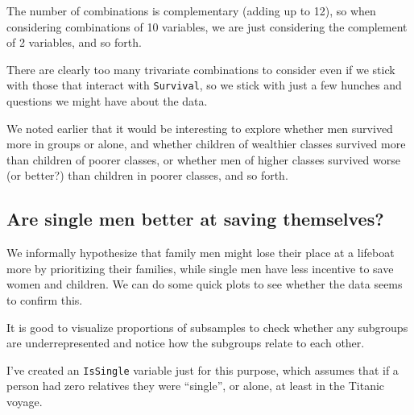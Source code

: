 \documentclass[]{article}
\newenvironment{Shaded}{\begin{snugshade}}{\end{snugshade}}
\newcommand{\KeywordTok}[1]{\textcolor[rgb]{0.13,0.29,0.53}{\textbf{#1}}}
\newcommand{\DataTypeTok}[1]{\textcolor[rgb]{0.13,0.29,0.53}{#1}}
\newcommand{\DecValTok}[1]{\textcolor[rgb]{0.00,0.00,0.81}{#1}}
\newcommand{\StringTok}[1]{\textcolor[rgb]{0.31,0.60,0.02}{#1}}
\newcommand{\CommentTok}[1]{\textcolor[rgb]{0.56,0.35,0.01}{\textit{#1}}}
\newcommand{\OperatorTok}[1]{\textcolor[rgb]{0.81,0.36,0.00}{\textbf{#1}}}
\newcommand{\NormalTok}[1]{#1}
\begin{document}
The number of combinations is complementary (adding up to 12), so when
considering combinations of 10 variables, we are just considering the
complement of 2 variables, and so forth.

There are clearly too many trivariate combinations to consider even if
we stick with those that interact with \texttt{Survival}, so we stick
with just a few hunches and questions we might have about the data.

We noted earlier that it would be interesting to explore whether men
survived more in groups or alone, and whether children of wealthier
classes survived more than children of poorer classes, or whether men of
higher classes survived worse (or better?) than children in poorer
classes, and so forth.

\subsection{Are single men better at saving
themselves?}\label{are-single-men-better-at-saving-themselves}

We informally hypothesize that family men might lose their place at a
lifeboat more by prioritizing their families, while single men have less
incentive to save women and children. We can do some quick plots to see
whether the data seems to confirm this.

It is good to visualize proportions of subsamples to check whether any
subgroups are underrepresented and notice how the subgroups relate to
each other.

I've created an \texttt{IsSingle} variable just for this purpose, which
assumes that if a person had zero relatives they were ``single'', or
alone, at least in the Titanic voyage.

\begin{Shaded}
\end{Shaded}
\end{document}
